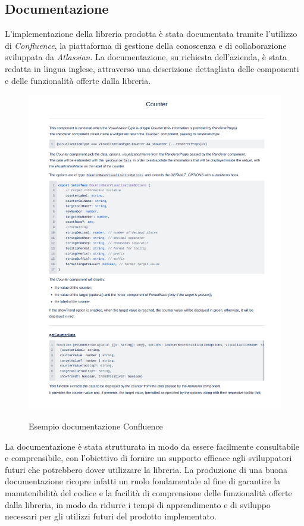 \subsection{Documentazione}
L'implementazione della libreria prodotta è stata documentata tramite l'utilizzo di \textit{Confluence}, la piattaforma
di gestione della conoscenza e di collaborazione sviluppata da \textit{Atlassian}. \newline
La documentazione, su richiesta dell'azienda, è stata redatta in lingua inglese, attraverso una descrizione dettagliata
delle componenti e delle funzionalità offerte dalla libreria. \newline

\begin{figure}[H]
    \centering
    \includegraphics[alt={Esempio documentazione Confluence}, width=1 \textwidth]{img/ex_confluence.png}
    \caption{Esempio documentazione Confluence}
    \label{fig:ex_confluence}
\end{figure}

La documentazione è stata strutturata in modo da essere facilmente consultabile e comprensibile, con l'obiettivo di
fornire un supporto efficace agli sviluppatori futuri che potrebbero dover utilizzare la libreria. \newline
La produzione di una buona documentazione ricopre infatti un ruolo fondamentale al fine di garantire la manutenibilità
del codice e la facilità di comprensione delle funzionalità offerte dalla libreria, in modo da ridurre i tempi di
apprendimento e di sviluppo necessari per gli utilizzi futuri del prodotto implementato.

